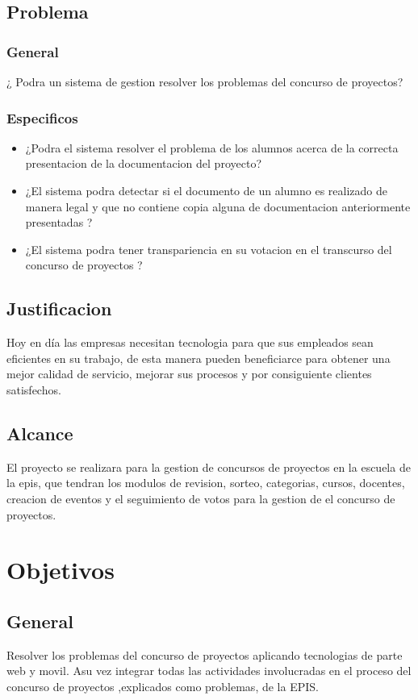 \documentclass[%
 reprint,
 amsmath,amssymb,
 aps,
]{revtex4-1}
\begin{document}
\subsection{Problema}
\subsubsection{General}
¿ Podra un sistema de gestion resolver los problemas del concurso de proyectos?
\subsubsection{Especificos}
\begin{itemize}
\item ¿Podra el sistema resolver el problema de los alumnos acerca de la correcta presentacion de la documentacion del proyecto?
\item ¿El sistema podra detectar si el documento de un alumno es realizado de manera legal y que no contiene copia alguna de documentacion anteriormente presentadas ?
\item ¿El sistema podra tener transpariencia en su votacion en el transcurso del concurso de proyectos ?
\end{itemize}
\subsection{Justificacion}
Hoy en día las empresas necesitan tecnologia para que sus empleados sean eficientes en su trabajo, de esta manera pueden beneficiarce para obtener una mejor calidad de servicio, mejorar sus procesos y por consiguiente clientes satisfechos.

\subsection{Alcance}
El proyecto se realizara para la gestion de concursos de proyectos en la escuela de la epis, que tendran los modulos de revision, sorteo, categorias, cursos, docentes, creacion de eventos y el seguimiento de votos para la gestion de el concurso de proyectos. 

\section {Objetivos}
\subsection {General}
Resolver los problemas del concurso de proyectos aplicando tecnologias de parte web y movil. Asu vez integrar todas las actividades involucradas en el proceso del concurso de proyectos ,explicados como problemas, de la EPIS.
\end{document}
